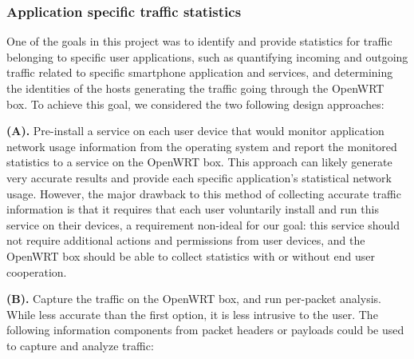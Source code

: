 \subsubsection{Application specific traffic statistics}
\label{sec:app-specific-design}

One of the goals in this project was to identify and provide statistics for traffic belonging to specific user applications, such as quantifying incoming and outgoing traffic related to specific smartphone application and services, and determining the identities of the hosts generating the traffic going through the OpenWRT box. To achieve this goal, we considered the two following design approaches:

\textbf{(A).} Pre-install a service on each user device that would monitor application network usage information from the operating system and report the monitored statistics to a service on the OpenWRT box. This approach can likely generate very accurate results and provide each specific application's statistical network usage. However, the major drawback to this method of collecting accurate traffic information is that it requires that each user voluntarily install and run this service on their devices, a requirement non-ideal for our goal: this service should not require additional actions and permissions from user devices, and the OpenWRT box should be able to collect statistics with or without end user cooperation.
	
\textbf{(B).}  Capture the traffic on the OpenWRT box, and run per-packet analysis. While less accurate than the first option, it is less intrusive to the user. The following information components from packet headers or payloads could be used to capture and analyze traffic:
	
